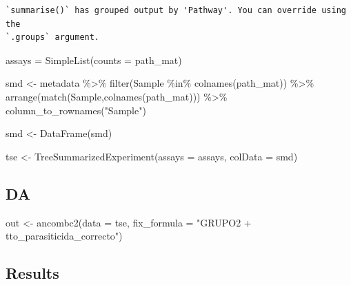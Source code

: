 \documentclass[
  letterpaper,
  DIV=11,
  numbers=noendperiod]{scrartcl}
\newenvironment{Shaded}{\begin{snugshade}}{\end{snugshade}}
\newcommand{\AttributeTok}[1]{\textcolor[rgb]{0.40,0.45,0.13}{#1}}
\newcommand{\FunctionTok}[1]{\textcolor[rgb]{0.28,0.35,0.67}{#1}}
\newcommand{\NormalTok}[1]{\textcolor[rgb]{0.00,0.23,0.31}{#1}}
\newcommand{\OtherTok}[1]{\textcolor[rgb]{0.00,0.23,0.31}{#1}}
\newcommand{\SpecialCharTok}[1]{\textcolor[rgb]{0.37,0.37,0.37}{#1}}
\newcommand{\StringTok}[1]{\textcolor[rgb]{0.13,0.47,0.30}{#1}}
\begin{document}
\begin{verbatim}
`summarise()` has grouped output by 'Pathway'. You can override using the
`.groups` argument.
\end{verbatim}

\begin{Shaded}
\begin{Highlighting}[]
\NormalTok{assays }\OtherTok{=} \FunctionTok{SimpleList}\NormalTok{(}\AttributeTok{counts =}\NormalTok{ path\_mat)}

\NormalTok{smd }\OtherTok{\textless{}{-}}\NormalTok{ metadata }\SpecialCharTok{\%\textgreater{}\%} 
  \FunctionTok{filter}\NormalTok{(Sample }\SpecialCharTok{\%in\%} \FunctionTok{colnames}\NormalTok{(path\_mat)) }\SpecialCharTok{\%\textgreater{}\%} 
  \FunctionTok{arrange}\NormalTok{(}\FunctionTok{match}\NormalTok{(Sample,}\FunctionTok{colnames}\NormalTok{(path\_mat))) }\SpecialCharTok{\%\textgreater{}\%} 
  \FunctionTok{column\_to\_rownames}\NormalTok{(}\StringTok{"Sample"}\NormalTok{)}

\NormalTok{smd }\OtherTok{\textless{}{-}} \FunctionTok{DataFrame}\NormalTok{(smd)}

\NormalTok{tse }\OtherTok{\textless{}{-}} \FunctionTok{TreeSummarizedExperiment}\NormalTok{(}\AttributeTok{assays =}\NormalTok{ assays,}
                                \AttributeTok{colData =}\NormalTok{ smd)}
\end{Highlighting}
\end{Shaded}

\hypertarget{da}{%
\subsection{DA}\label{da}}

\begin{Shaded}
\begin{Highlighting}[]
\NormalTok{out }\OtherTok{\textless{}{-}} \FunctionTok{ancombc2}\NormalTok{(}\AttributeTok{data =}\NormalTok{ tse, }\AttributeTok{fix\_formula =} \StringTok{"GRUPO2 + tto\_parasiticida\_correcto"}\NormalTok{)}
\end{Highlighting}
\end{Shaded}

\hypertarget{results}{%
\subsection{Results}\label{results}}
\end{document}
